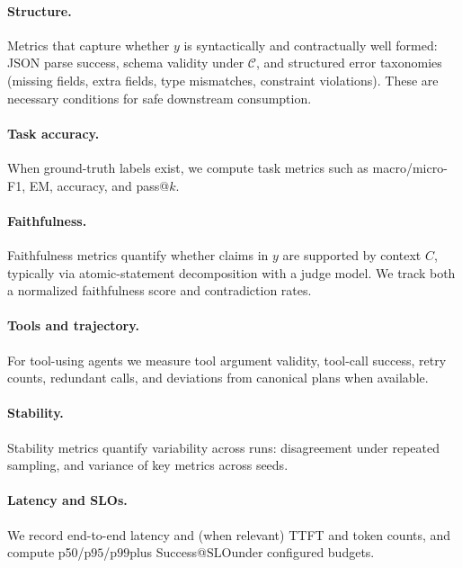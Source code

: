 \documentclass[11pt]{article}
\newcommand{\pninetyfive}{\ensuremath{\mathrm{p95}}}
\newcommand{\pninetynine}{\ensuremath{\mathrm{p99}}}
\newcommand{\slo}{\ensuremath{\mathrm{SLO}}}
\begin{document}
\paragraph{Structure.}
Metrics that capture whether $y$ is syntactically and contractually well formed:
JSON parse success, schema validity under $\mathcal{C}$, and structured error taxonomies (missing fields, extra fields, type mismatches, constraint violations).
These are necessary conditions for safe downstream consumption.

\paragraph{Task accuracy.}
When ground-truth labels exist, we compute task metrics such as macro/micro-F1, EM, accuracy, and pass@$k$.

\paragraph{Faithfulness.}
Faithfulness metrics quantify whether claims in $y$ are supported by context $C$, typically via atomic-statement decomposition with a judge model.
We track both a normalized faithfulness score and contradiction rates.

\paragraph{Tools and trajectory.}
For tool-using agents we measure tool argument validity, tool-call success, retry counts, redundant calls, and deviations from canonical plans when available.

\paragraph{Stability.}
Stability metrics quantify variability across runs: disagreement under repeated sampling, and variance of key metrics across seeds.

\paragraph{Latency and SLOs.}
We record end-to-end latency and (when relevant) TTFT and token counts, and compute p50/\pninetyfive/\pninetynine plus Success@\slo under configured budgets.

\medskip
\end{document}
